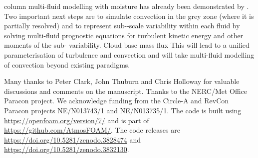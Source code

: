 \documentclass[draft]{agujournal2019}
\begin{document}
 column multi-fluid modelling with moisture has already been demonstrated by  
.
Two important next steps are to simulate convection in the grey zone (where it is partially resolved) and to represent sub--scale variability within each fluid by solving multi-fluid prognostic equations for turbulent kinetic energy and other moments of the sub- variability. 
Cloud base mass flux 
This will lead
to a unified parameterisation of turbulence and convection and will
take multi-fluid modelling of convection beyond existing paradigms. 

\acknowledgments

Many thanks to Peter Clark, John Thuburn and Chris Holloway for valuable discussions and comments on the manuscript.
Thanks to the NERC/Met Office Paracon project. We acknowledge funding
from the Circle-A and RevCon Paracon projects NE/N013743/1 and NE/N013735/1. The code is built using \url{https://openfoam.org/version/7/} and is part of \url{https://github.com/AtmosFOAM/}. The code releases are \url{https://doi.org/10.5281/zenodo.3828474} and \url{https://doi.org/10.5281/zenodo.3832130}.


\end{document}
